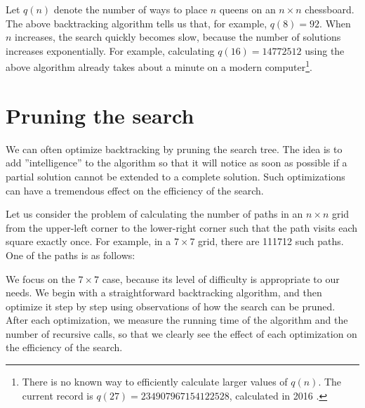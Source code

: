 Let $q(n)$ denote the number of ways
to place $n$ queens on an $n \times n$ chessboard.
The above backtracking
algorithm tells us that, for example, $q(8)=92$.
When $n$ increases, the search quickly becomes slow,
because the number of solutions increases
exponentially.
For example, calculating $q(16)=14772512$
using the above algorithm already takes about a minute
on a modern computer\footnote{There is no known way to efficiently
calculate larger values of $q(n)$. The current record is
$q(27)=234907967154122528$, calculated in 2016 \cite{q27}.}.

\section{Pruning the search}

We can often optimize backtracking
by pruning the search tree.
The idea is to add ''intelligence'' to the algorithm
so that it will notice as soon as possible
if a partial solution cannot be extended
to a complete solution.
Such optimizations can have a tremendous
effect on the efficiency of the search.

Let us consider the problem
of calculating the number of paths
in an $n \times n$ grid from the upper-left corner
to the lower-right corner such that the
path visits each square exactly once.
For example, in a $7 \times 7$ grid,
there are 111712 such paths.
One of the paths is as follows:

\begin{center}
\end{center}

We focus on the $7 \times 7$ case,
because its level of difficulty is appropriate to our needs.
We begin with a straightforward backtracking algorithm,
and then optimize it step by step using observations
of how the search can be pruned.
After each optimization, we measure the running time
of the algorithm and the number of recursive calls,
so that we clearly see the effect of each
optimization on the efficiency of the search.

